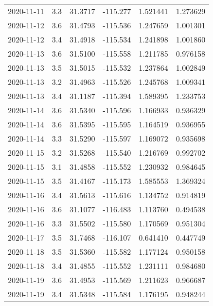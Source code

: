 \begin{tabular}{lrrrrr}
2020-11-11 &       3.3 &  31.3717 &  -115.277 &         1.521441 &         1.273629 \\
2020-11-12 &       3.6 &  31.4793 &  -115.536 &         1.247659 &         1.001301 \\
2020-11-12 &       3.4 &  31.4918 &  -115.534 &         1.241898 &         1.001860 \\
2020-11-13 &       3.6 &  31.5100 &  -115.558 &         1.211785 &         0.976158 \\
2020-11-13 &       3.5 &  31.5015 &  -115.532 &         1.237864 &         1.002849 \\
2020-11-13 &       3.2 &  31.4963 &  -115.526 &         1.245768 &         1.009341 \\
2020-11-13 &       3.4 &  31.1187 &  -115.394 &         1.589395 &         1.233753 \\
2020-11-14 &       3.6 &  31.5340 &  -115.596 &         1.166933 &         0.936329 \\
2020-11-14 &       3.6 &  31.5395 &  -115.595 &         1.164519 &         0.936955 \\
2020-11-14 &       3.3 &  31.5290 &  -115.597 &         1.169072 &         0.935698 \\
2020-11-15 &       3.2 &  31.5268 &  -115.540 &         1.216769 &         0.992702 \\
2020-11-15 &       3.1 &  31.4858 &  -115.552 &         1.230932 &         0.984645 \\
2020-11-15 &       3.5 &  31.4167 &  -115.173 &         1.585553 &         1.369324 \\
2020-11-16 &       3.4 &  31.5613 &  -115.616 &         1.134752 &         0.914819 \\
2020-11-16 &       3.6 &  31.1077 &  -116.483 &         1.113760 &         0.494538 \\
2020-11-16 &       3.3 &  31.5502 &  -115.580 &         1.170569 &         0.951304 \\
2020-11-17 &       3.5 &  31.7468 &  -116.107 &         0.641410 &         0.447749 \\
2020-11-18 &       3.5 &  31.5360 &  -115.582 &         1.177124 &         0.950158 \\
2020-11-18 &       3.4 &  31.4855 &  -115.552 &         1.231111 &         0.984680 \\
2020-11-19 &       3.6 &  31.4953 &  -115.569 &         1.211623 &         0.966687 \\
2020-11-19 &       3.4 &  31.5348 &  -115.584 &         1.176195 &         0.948244 \\

\end{tabular}
